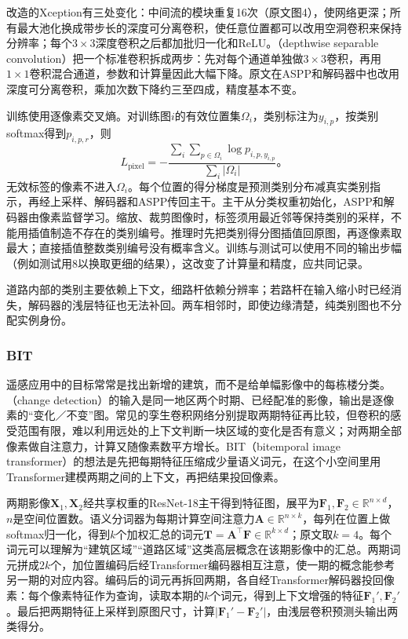 改造的Xception有三处变化：中间流的模块重复16次（原文图4），使网络更深；所有最大池化换成带步长的深度可分离卷积，使任意位置都可以改用空洞卷积来保持分辨率；每个$3\times3$深度卷积之后都加批归一化和ReLU。（depthwise separable convolution）把一个标准卷积拆成两步：先对每个通道单独做$3\times3$卷积，再用$1\times1$卷积混合通道，参数和计算量因此大幅下降。原文在ASPP和解码器中也改用深度可分离卷积，乘加次数下降约三至四成，精度基本不变。

训练使用逐像素交叉熵。对训练图$i$的有效位置集$\Omega_i$，类别标注为$y_{i,p}$，按类别softmax得到$p_{i,p,r}$，则
\begin{equation}
 L_{\mathrm{pixel}}=
 -\frac{\sum_i\sum_{p\in\Omega_i}\log p_{i,p,y_{i,p}}}
        {\sum_i|\Omega_i|}\text{。}
 \label{eq:vision-dense-pixel-training}
\end{equation}
无效标签的像素不进入$\Omega_i$。每个位置的得分梯度是预测类别分布减真实类别指示，再经上采样、解码器和ASPP传回主干。主干从分类权重初始化，ASPP和解码器由像素监督学习。缩放、裁剪图像时，标签须用最近邻等保持类别的采样，不能用插值制造不存在的类别编号。推理时先把类别得分图插值回原图，再逐像素取最大；直接插值整数类别编号没有概率含义。训练与测试可以使用不同的输出步幅（例如测试用8以换取更细的结果），这改变了计算量和精度，应共同记录。

道路内部的类别主要依赖上下文，细路杆依赖分辨率；若路杆在输入缩小时已经消失，解码器的浅层特征也无法补回。两车相邻时，即使边缘清楚，纯类别图也不分配实例身份。

\subsubsection{BIT}
\label{sec:vision-recognition-bit}

遥感应用中的目标常常是找出新增的建筑，而不是给单幅影像中的每栋楼分类。（change detection）的输入是同一地区两个时期、已经配准的影像，输出是逐像素的“变化／不变”图。常见的孪生卷积网络分别提取两期特征再比较，但卷积的感受范围有限，难以利用远处的上下文判断一块区域的变化是否有意义；对两期全部像素做自注意力，计算又随像素数平方增长。BIT（bitemporal image transformer）的想法是先把每期特征压缩成少量语义词元，在这个小空间里用Transformer建模两期之间的上下文，再把结果投回像素。

两期影像$\bm{X}_1,\bm{X}_2$经共享权重的ResNet-18主干得到特征图，展平为$\bm{F}_1,\bm{F}_2\in\mathbb{R}^{n\times d}$，$n$是空间位置数。语义分词器为每期计算空间注意力$\bm{A}\in\mathbb{R}^{n\times k}$，每列在位置上做softmax归一化，得到$k$个加权汇总的词元$\bm{T}=\bm{A}^{\top}\bm{F}\in\mathbb{R}^{k\times d}$；原文取$k=4$。每个词元可以理解为“建筑区域”“道路区域”这类高层概念在该期影像中的汇总。两期词元拼成$2k$个，加位置编码后经Transformer编码器相互注意，使一期的概念能参考另一期的对应内容。编码后的词元再拆回两期，各自经Transformer解码器投回像素：每个像素特征作为查询，读取本期的$k$个词元，得到上下文增强的特征$\bm{F}_1',\bm{F}_2'$。最后把两期特征上采样到原图尺寸，计算$|\bm{F}_1'-\bm{F}_2'|$，由浅层卷积预测头输出两类得分。

